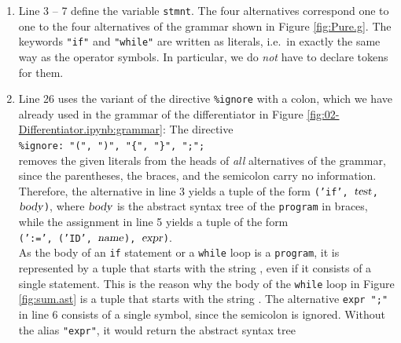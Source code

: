 \begin{enumerate}
      As the alternative \texttt{stmnt*} contains no literal, the name of the variable \texttt{program} is used
      as the head of the tuple.  Hence, a program consisting of the statements $s_1$, $\cdots$, $s_n$ is represented as the tuple
      \texttt{('program', $s_1$, $\cdots$, $s_n$)}.  Note that the head of a tuple is determined by the grammar
      and not by the input:  Even a program that consists of a single statement is represented by a tuple
      with the head .
\item Line 3 -- 7 define the variable \texttt{stmnt}.  The four alternatives correspond one to one to the
      four alternatives of the grammar shown in Figure \ref{fig:Pure.g}.  The keywords \texttt{"if"} and
      \texttt{"while"} are written as literals, i.e.~in exactly the same way as the operator symbols.  In
      particular, we do \emph{not} have to declare tokens for them.
\item Line 26 uses the variant of the directive \texttt{\%ignore} with a colon, which we have already used in
      the grammar of the differentiator in Figure \ref{fig:02-Differentiator.ipynb:grammar}:  The directive
      \\[0.2cm]
      \hspace*{1.3cm}
      \verb|%ignore: "(", ")", "{", "}", ";";|
      \\[0.2cm]
      removes the given literals from the heads of \emph{all} alternatives of the grammar, since the
      parentheses, the braces, and the semicolon carry no information.  Therefore, the alternative in line 3
      yields a tuple of the form \texttt{('if', $\textsl{test}$, $\textsl{body}$)}, where $\textsl{body}$ is
      the abstract syntax tree of the \texttt{program} in braces, while the assignment in line 5 yields a tuple
      of the form
      \\[0.2cm]
      \hspace*{1.3cm}
      \texttt{(':=', ('ID', $\textsl{name}$), $\textsl{expr}$)}.
      \\[0.2cm]
      As the body of an \texttt{if} statement or a \texttt{while} loop is a \texttt{program}, it is
      represented by a tuple that starts with the string , even if it consists of a single
      statement.  This is the reason why the body of the \texttt{while} loop in Figure \ref{fig:sum.ast} is a
      tuple that starts with the string .  The alternative \texttt{expr ";"} in line 6
      consists of a single symbol, since the semicolon is ignored.  Without the alias \texttt{"expr"}, it would return the abstract syntax tree

\end{enumerate}
